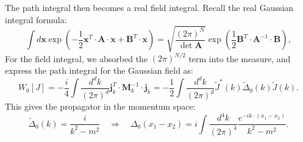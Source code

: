 \documentclass[aps,prb,superscriptaddress,nofootinbib]{revtex4}
\begin{document}
The path integral then becomes a real field integral.
Recall the real Gaussian integral formula:
\begin{equation}
	\int d\mathbf x \exp\left(-\frac{1}{2}\mathbf{x}^T \cdot \mathbf A \cdot \mathbf{x} + \mathbf{B}^T \cdot \mathbf{x}\right) 
	= \sqrt{\frac{(2\pi)^N}{\det{\mathbf A}}}\exp\left(\frac{1}{2}\mathbf{B}^T \cdot \mathbf{A}^{-1} \cdot \mathbf{B}\right),
	\label{eq:real-gaussian-integral}
\end{equation}
For the field integral, we absorbed the $(2\pi)^{N/2}$ term into the measure, and express the path integral for the Gaussian field as:
\begin{equation}
	W_0[J] 
	= -\frac{i}{4}\int \frac{d^d k}{(2\pi)^d} \mathbf j^T_k \cdot \mathbf M^{-1}_k \cdot \mathbf j_k
	= -\frac{1}{2} \int \frac{d^d k}{(2\pi)^d}  \tilde{J}^*(k) \tilde{\Delta}_0(k) \tilde{J}(k).
\end{equation}
This gives the propagator in the momentum space:
\begin{equation}
	\tilde{\Delta}_0(k) = \frac{i}{k^2-m^2}
	\quad \Longrightarrow \quad 
	\Delta_0(x_1-x_2) = i\int\frac{d^{4} k}{(2\pi)^{4}} \frac{e^{-i k\cdot (x_1-x_2)}}{k^2-m^2}.
\end{equation}
\end{document}
